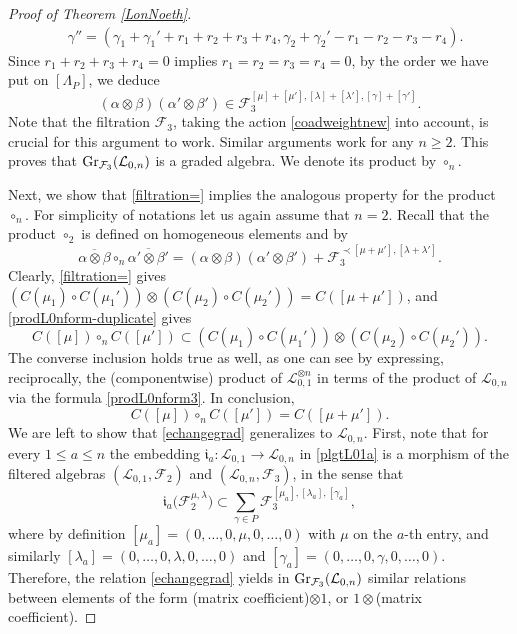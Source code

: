 \documentclass[10pt,a4paper]{amsart}
\numberwithin{equation}{section}
\theoremstyle{definition}
\newcommand{\Ff}{{\mathcal F}}
\newcommand{\Ll}{{\mathcal L}}
\newcommand{\ra}{\rightarrow}
\begin{document}
\begin{proof}[Proof of Theorem \ref{LonNoeth}]
\begin{align*}
& \gamma'' = (\gamma_1+\gamma_1'+r_1+r_2+r_3+r_4,\gamma_2+\gamma_2'-r_1-r_2-r_3-r_4).
\end{align*}
Since $r_1+r_2+r_3+r_4=0$ implies $r_1=r_2=r_3=r_4=0$, by the order we have put on $[\Lambda_P]$, we deduce
 \[(\alpha\otimes \beta)(\alpha'\otimes \beta') \in \Ff_3^{[\mu]+[\mu'],[\lambda]+[\lambda'],[\gamma]+[\gamma']}.\]
Note that the filtration $\mathcal{F}_3$, taking the action \eqref{coadweightnew} into account, is crucial for this argument to work. Similar arguments work for any $n\geq 2$. This proves that ${\rm Gr}_{{\mathcal F}_3}({\mathcal L}_{0,n})$ is a graded algebra. We denote its product by $\circ_n$.

Next, we show that \eqref{filtration=} implies the analogous property for the product $\circ_n$. For simplicity of notations let us again assume that $n=2$. Recall that the product $\circ_2$ is defined on homogeneous elements  and  by \[\overline{\alpha\otimes \beta}\circ_n\overline{\alpha'\otimes \beta'} = (\alpha\otimes \beta)(\alpha'\otimes \beta') + {\mathcal F}_3^{\prec [\mu+\mu'],[\lambda+\lambda']}.\]
Clearly, \eqref{filtration=} gives $(C(\mu_1)\circ C(\mu_1'))\otimes (C(\mu_2)\circ C(\mu_2')) = C([\mu + \mu'])$, and \eqref{prodL0nform-duplicate} gives
 \[C([\mu]) \circ_n C([\mu']) \subset (C(\mu_1)\circ C(\mu_1'))\otimes (C(\mu_2)\circ C(\mu_2')).\]
The converse inclusion holds true as well, as one can see by expressing, reciprocally, the (componentwise) product of $\Ll_{0,1}^{\otimes n}$ in terms of the product of $\Ll_{0,n}$ via the formula \eqref{prodL0nform3}. In conclusion,%
\[%
C([\mu]) \circ_n C([\mu']) = C([\mu + \mu']).
\]
We are left to show that \eqref{echangegrad} generalizes to $\Ll_{0,n}$. First, note that for every $1\leq a\leq n$ the embedding $\mathfrak{i}_a\colon \Ll_{0,1}\ra \Ll_{0,n}$ in \eqref{plgtL01a} is a morphism of the filtered algebras $(\Ll_{0,1},\mathcal{F}_2)$ and $(\Ll_{0,n},\mathcal{F}_3)$, in the sense that
\[\mathfrak{i}_a\big({\mathcal F}_2^{\mu,\lambda}\big) \subset \sum_{\gamma \in P} {\mathcal F}_3^{[\mu_a],[\lambda_a],[\gamma_a]},
\]
where by definition $[\mu_a] = (0,\dots,0,\mu,0,\dots,0)$ with $\mu$ on the $a$-th entry, and similarly $[\lambda_a] = (0,\dots,0,\lambda,0,\dots,0)$ and $[\gamma_a] = (0,\dots,0,\gamma,0,\dots,0)$. Therefore, the relation \eqref{echangegrad} yields in ${\rm Gr}_{{\mathcal F}_3}({\mathcal L}_{0,n})$ similar relations between elements of the form (matrix coefficient)$\otimes 1$, or $1 \otimes$(matrix coefficient).


\end{proof}
\end{document}
